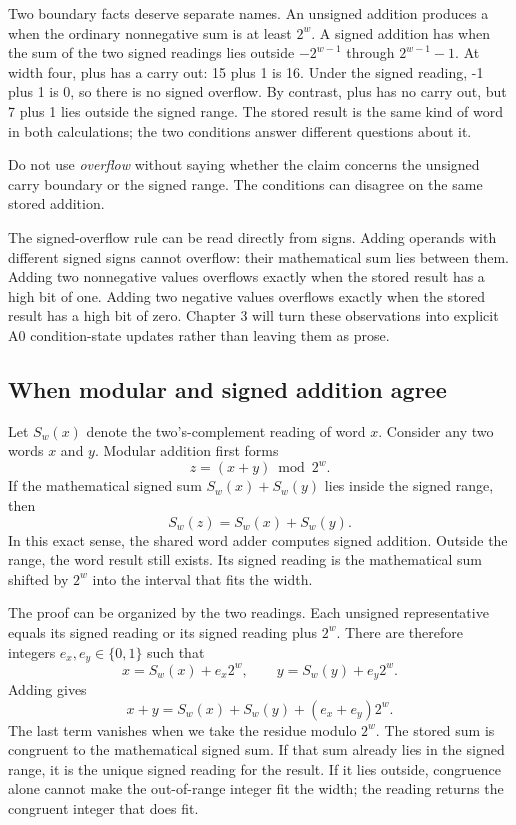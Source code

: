 Two boundary facts deserve separate names. An unsigned addition produces a
 when the ordinary nonnegative sum is at least \(2^w\).
A signed addition has  when the sum of the two signed
readings lies outside \(-2^{w-1}\) through \(2^{w-1}-1\). At width four,
 plus  has a carry out: 15 plus 1 is 16. Under the
signed reading, -1 plus 1 is 0, so there is no signed overflow. By contrast,
 plus  has no carry out, but 7 plus 1 lies outside the
signed range. The stored result  is the same kind of word in both
calculations; the two conditions answer different questions about it.

\begin{warning}[title={One result, two overflow questions}]
Do not use \emph{overflow} without saying whether the claim concerns the
unsigned carry boundary or the signed range. The conditions can disagree on
the same stored addition.
\end{warning}

The signed-overflow rule can be read directly from signs. Adding operands with
different signed signs cannot overflow: their mathematical sum lies between
them. Adding two nonnegative values overflows exactly when the stored result
has a high bit of one. Adding two negative values overflows exactly when the
stored result has a high bit of zero. Chapter 3 will turn these observations
into explicit A0 condition-state updates rather than leaving them as prose.

\subsection{When modular and signed addition agree}

Let \(S_w(x)\) denote the two's-complement reading of word \(x\). Consider any
two words \(x\) and \(y\). Modular addition first forms
\[
  z=(x+y)\bmod2^w.
\]
If the mathematical signed sum \(S_w(x)+S_w(y)\) lies inside the signed
range, then
\[
  S_w(z)=S_w(x)+S_w(y).
\]
In this exact sense, the shared word adder computes signed addition. Outside
the range, the word result still exists. Its signed reading
is the mathematical sum shifted by \(2^w\) into the interval that fits the
width.

The proof can be organized by the two readings. Each unsigned representative
equals its signed reading or its signed reading plus \(2^w\). There are
therefore integers \(e_x,e_y\in\{0,1\}\) such that
\[
  x=S_w(x)+e_x2^w,
  \qquad
  y=S_w(y)+e_y2^w.
\]
Adding gives
\[
  x+y=S_w(x)+S_w(y)+(e_x+e_y)2^w.
\]
The last term vanishes when we take the residue modulo \(2^w\). The stored
sum is congruent to the mathematical signed sum. If that sum already lies in
the signed range, it is the unique signed reading for the result. If it lies
outside, congruence alone cannot make the out-of-range integer fit the width;
the reading returns the congruent integer that does fit.

